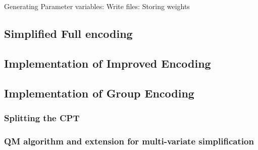     Generating Parameter variables:
    Write files:
    Storing weights
    \subsection{Simplified Full encoding}
    \subsection{Implementation of Improved Encoding}
    \subsection{Implementation of Group Encoding}
        \subsubsection{Splitting the CPT}
        \subsubsection{QM algorithm and extension for multi-variate simplification}
